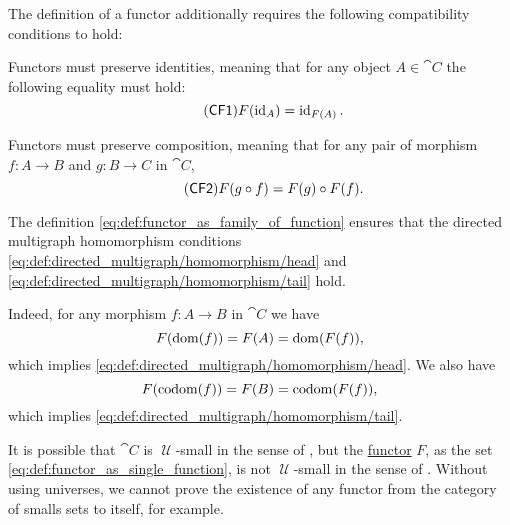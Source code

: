 \begin{definition}
  The definition of a functor additionally requires the following compatibility conditions to hold:
  \begin{thmenum}[series=def:functor]
     Functors must preserve identities, meaning that for any object \( A \in \cat{C} \) the following equality must hold:
    \begin{equation}\label{eq:def:functor/CF1}\tag{\logic{CF1}}
      F(\id_A) = \id_{F(A)}.
    \end{equation}

     Functors must preserve composition, meaning that for any pair of morphism \( f: A \to B \) and \( g: B \to C \) in \( \cat{C} \),
    \begin{equation}\label{eq:def:functor/CF2}\tag{\logic{CF2}}
      F(g \bincirc f) = F(g) \bincirc F(f).
    \end{equation}
  \end{thmenum}
\end{definition}
\begin{defproof}
  The definition \eqref{eq:def:functor_as_family_of_function} ensures that the directed multigraph homomorphism conditions \eqref{eq:def:directed_multigraph/homomorphism/head} and \eqref{eq:def:directed_multigraph/homomorphism/tail} hold.

  Indeed, for any morphism \( f: A \to B \) in \( \cat{C} \) we have
  \begin{equation*}
    F(\operatorname{dom}(f)) = F(A) = \operatorname{dom}(F(f)),
  \end{equation*}
  which implies \eqref{eq:def:directed_multigraph/homomorphism/head}. We also have
  \begin{equation*}
    F(\operatorname*{co\negthinspace\operatorname{dom}}(f)) = F(B) = \operatorname*{co\negthinspace\operatorname{dom}}(F(f)),
  \end{equation*}
  which implies \eqref{eq:def:directed_multigraph/homomorphism/tail}.
\end{defproof}

\begin{remark}\label{rem:functor_size}
  It is possible that \( \cat{C} \) is \( \mscrU \)-small in the sense of , but the \hyperref[def:functor]{functor} \( F \), as the set \eqref{eq:def:functor_as_single_function}, is not \( \mscrU \)-small in the sense of . Without using universes, we cannot prove the existence of any functor from the category of smalls sets to itself, for example.
\end{remark}

